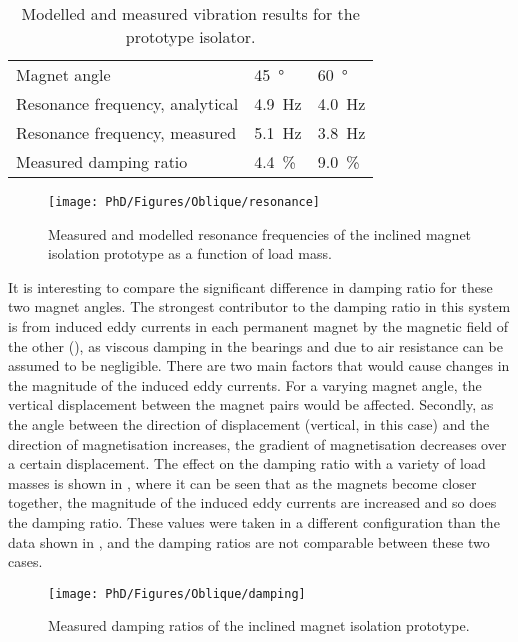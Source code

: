 \documentclass[11pt,a4paper]{memoir}
\begin{document}
\begin{table}
\caption{Modelled and measured vibration results for the prototype isolator.}
\begin{tabular}{@{}lll@{}}
\toprule
Magnet angle & \SI{45}{\degree} & \SI{60}{\degree} \\
Resonance frequency, analytical & \SI{4.9}{Hz} & \SI{4.0}{Hz} \\
Resonance frequency, measured & \SI{5.1}{Hz} & \SI{3.8}{Hz} \\
Measured damping ratio & \SI{4.4}{\%} & \SI{9.0}{\%} \\
\bottomrule
\end{tabular}
\end{table}

\begin{figure}
\centering
\texttt{[image: PhD/Figures/Oblique/resonance]}
\caption{Measured and modelled resonance frequencies of the inclined magnet isolation prototype as a function of load mass.}
\end{figure}

It is interesting to compare the significant difference in damping ratio for these two magnet angles.
The strongest contributor to the damping ratio in this system is from induced eddy currents in each permanent magnet by the magnetic field of the other (), as viscous damping in the bearings and due to air resistance can be assumed to be negligible.
There are two main factors that would cause changes in the magnitude of the induced eddy currents.
For a varying magnet angle, the vertical displacement between the magnet pairs would be affected.
Secondly, as the angle between the direction of displacement (vertical, in this case) and the direction of magnetisation increases, the gradient of magnetisation decreases over a certain displacement.
The effect on the damping ratio with a variety of load masses is shown in , where it can be seen that as the magnets become closer together, the magnitude of the induced eddy currents are increased and so does the damping ratio.
These values were taken in a different configuration than the data shown in , and the damping ratios are not comparable between these two cases.

\begin{figure}
\centering
\texttt{[image: PhD/Figures/Oblique/damping]}
\caption{Measured damping ratios of the inclined magnet isolation prototype.}
\end{figure}
\end{document}
